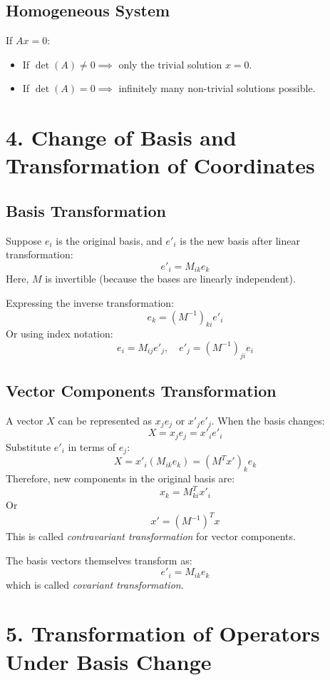 \documentclass[12pt, a4paper]{report}
\begin{document}
\subsection*{Homogeneous System}
If $A x = 0$:
\begin{itemize}
    \item If $\det(A) \neq 0 \implies$ only the trivial solution $x = 0$.
    \item If $\det(A) = 0 \implies$ infinitely many non-trivial solutions possible.
\end{itemize}

\section*{4. Change of Basis and Transformation of Coordinates}

\subsection*{Basis Transformation}

Suppose $e_i$ is the original basis, and $e'_i$ is the new basis after linear transformation:
\[
e'_i = M_{ik} e_k
\]
Here, $M$ is invertible (because the bases are linearly independent).

Expressing the inverse transformation:
\[
e_k = (M^{-1})_{k i} e'_i
\]
Or using index notation:
\[
e_i = M_{ij} e'_j, \quad e'_j = (M^{-1})_{ji} e_i
\]

\subsection*{Vector Components Transformation}

A vector $X$ can be represented as $x_j e_j$ or $x'_j e'_j$. When the basis changes:
\[
X = x_j e_j = x'_i e'_i
\]
Substitute $e'_i$ in terms of $e_j$:
\[
X = x'_i (M_{ik} e_k) = (M^{T} x')_k e_k
\]
Therefore, new components in the original basis are:
\[
x_k = M^{T}_{k i} x'_i
\]
Or
\[
x' = (M^{-1})^{T} x
\]
This is called \textit{contravariant transformation} for vector components.

The basis vectors themselves transform as:
\[
e'_i = M_{ik} e_k
\]
which is called \textit{covariant transformation}.

\section*{5. Transformation of Operators Under Basis Change}
\end{document}
